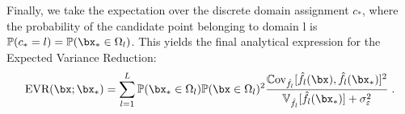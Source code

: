 Finally, we take the expectation over the discrete domain assignment $c_*$, where the probability of the candidate point belonging to domain l is $\mathbb{P}(c_* = l) = \mathbb{P}(\bx_* \in \Omega_l)$. This yields the final analytical expression for the Expected Variance Reduction:
\begin{equation}
    \text{EVR}(\bx; \bx_*) = \sum_{l=1}^L \mathbb{P}(\bx_* \in \Omega_l) \mathbb{P}(\bx \in \Omega_l)^2 \frac{\mathbb{C}\text{ov}_{\hat{f}_l}[\hat{f}_l(\bx), \hat{f}_l(\bx_*)]^2}{\mathbb{V}_{\hat{f}_l}[\hat{f}_l(\bx_*)] + \sigma_\varepsilon^2} \;.
    \label{eq:mixture_evr_final}
\end{equation}
